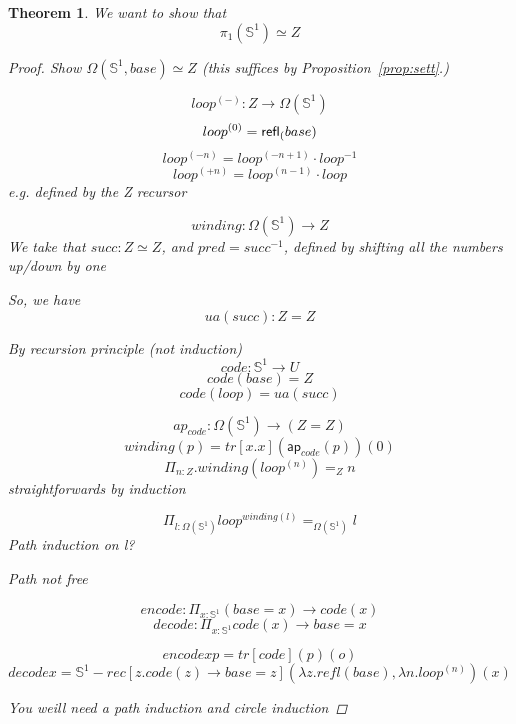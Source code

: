 \documentclass[11pt]{article}
\renewcommand{\SS}{\mathbb{S}}
\newcommand*{\ap}{\mathsf{ap}}
\newtheorem{thm}{Theorem}
\begin{document}
\begin{thm}
We want to show that
$$\pi_1(\SS^1) \simeq Z$$
\begin{proof}
Show $\Omega(\SS^1, base) \simeq Z$ (this suffices by Proposition~\ref{prop:sett}.)

$$loop^{(-)} : Z \rightarrow \Omega(\SS^1)$$
$$loop^{(0)} = \mathsf{refl}_{(} base)$$
$$loop^{(-n)} = loop^{(-n + 1)} \cdot loop^{-1}$$
$$loop^{(+n)} = loop^{(n - 1)} \cdot loop$$
e.g. defined by the Z recursor

$$winding : \Omega(\SS^{1}) \rightarrow Z$$
We take that $succ : Z \simeq Z$, and $pred = succ^{-1}$, defined by shifting all the numbers up/down by one

So, we have
$$ua(succ) : Z = Z$$

By recursion principle (not induction)
$$code : \SS^1 \rightarrow U$$
$$code(base) = Z$$
$$code(loop) = ua(succ)$$

$$ap_{code} : \Omega(\SS^1) \rightarrow (Z = Z)$$
$$winding(p) = tr[x.x](\ap_{code}(p))(0)$$
$$\Pi_{n : Z} . winding(loop^{(n)}) =_Z n$$
straightforwards by induction

$$\Pi_{l : \Omega(\SS^1)} loop^{winding(l)} =_{\Omega(\SS^1)} l$$
Path induction on l?

Path not free

$$encode : \Pi_{x : \SS^1} (base = x) \rightarrow code(x)$$
$$decode : \Pi_{x : \SS^1} code(x) \rightarrow base = x$$

$$encode x p = tr[code](p)(o)$$
$$decode x = \SS^1-rec[z.code(z) \rightarrow base = z](\lambda z . refl(base), \lambda n . loop^{(n)})(x)$$


You weill need a path induction and circle induction
\end{proof}
\end{thm}
\end{document}
